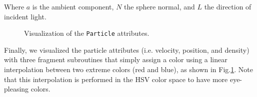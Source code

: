 \noindent
Where $a$ is the ambient component, $N$ the sphere normal, and $L$ the direction of incident light.\\

\begin{figure}[ht!]
    \centering
        \hfill
        \hfill
        \centering{}
    \caption{Visualization of the \texttt{Particle} attributes.}\label{fig:particleRender}
\end{figure}

\noindent
Finally, we visualized the particle attributes (i.e. velocity, position, and density) with three fragment subroutines that simply assign a color using a linear interpolation between two extreme colors (red and blue), as shown in Fig.\ref{fig:particleRender}. Note that this interpolation is performed in the HSV color space to have more eye-pleasing colors.


